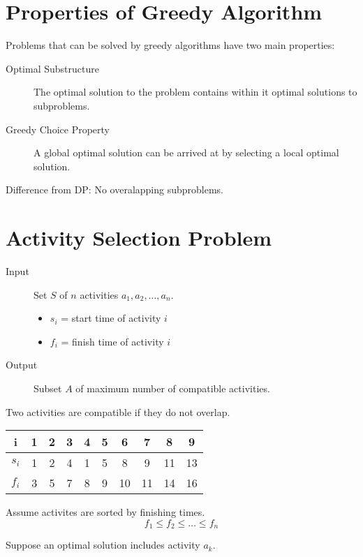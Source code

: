 \documentclass{article}
\begin{document}
\section*{Properties of Greedy Algorithm}
Problems that can be solved by greedy algorithms have two main properties:
\begin{description}
    \item[Optimal Substructure] The optimal solution to the problem contains within it optimal solutions to subproblems.
    \item[Greedy Choice Property] A global optimal solution can be arrived at by selecting a local optimal solution.
\end{description}

Difference from DP: No overalapping subproblems.

\section*{Activity Selection Problem}

\begin{description}
    \item[Input] Set \(S\) of \(n\) activities \(a_1, a_2, \ldots, a_n\).
        \begin{itemize}
            \item \(s_i\) = start time of activity \(i\)
            \item \(f_i\) = finish time of activity \(i\)
        \end{itemize}
    \item[Output] Subset \(A\) of maximum number of compatible activities.
\end{description}
Two activities are compatible if they do not overlap.

\begin{tabular}{c|ccccccccc}
    i       & 1 & 2 & 3 & 4 & 5 & 6  & 7  & 8  & 9  \\
    \hline
    \(s_i\) & 1 & 2 & 4 & 1 & 5 & 8  & 9  & 11 & 13 \\
    \(f_i\) & 3 & 5 & 7 & 8 & 9 & 10 & 11 & 14 & 16 \\
\end{tabular}

Assume activites are sorted by finishing times.
\begin{equation*}
    f_1 \leq f_2 \leq \ldots \leq f_n
\end{equation*}

Suppose an optimal solution includes activity \(a_k\).
\end{document}
